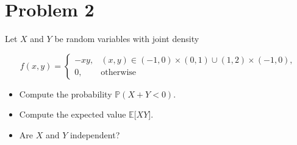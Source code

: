 \documentclass{qlnotes-export}
\begin{document}
\section{Problem 2}\label{problem-2-3}

Let \(X\) and \(Y\) be random variables with joint density

\[f(x,y) = \left\{ \begin{matrix}
{- xy,} & {(x,y) \in ( - 1,0) \times (0,1) \cup (1,2) \times ( - 1,0),} \\
{0,} & \text{otherwise}
\end{matrix} \right.\]

\begin{itemize}
\item
  Compute the probability \({\mathbb{P}}(X + Y < 0)\).
\item
  Compute the expected value \({\mathbb{E}}\lbrack XY\rbrack\).
\item
  Are \(X\) and \(Y\) independent?
\end{itemize}
\end{document}

